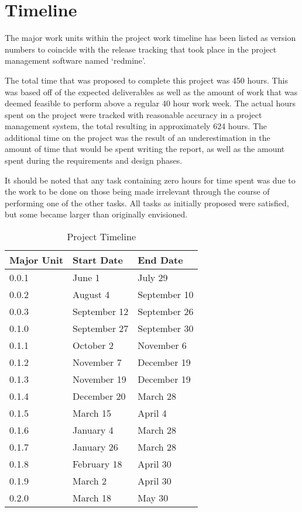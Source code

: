 \section{Timeline}\label{sec:timeline}

  The major work units within the project work timeline has been listed as
  version numbers to coincide with the release tracking that took place in the
  project management software named `redmine'.

  The total time that was proposed to complete this project was 450 hours. This
  was based off of the expected deliverables as well as the amount of work that
  was deemed feasible to perform above a regular 40 hour work week. The actual
  hours spent on the project were tracked with reasonable accuracy in a project
  management system, the total resulting in approximately 624 hours. The
  additional time on the project was the result of an underestimation in the
  amount of time that would be spent writing the report, as well as the amount
  spent during the requirements and design phases.

  It should be noted that any task containing zero hours for time spent was due
  to the work to be done on those being made irrelevant through the course of
  performing one of the other tasks. All tasks as initially proposed were
  satisfied, but some became larger than originally envisioned.

  \begin{table}[H]
    \centering
    \begin{tabular}{l p{4cm} p{4cm}}
      \toprule
      Major Unit & Start Date & End Date \\ [0.5ex]
      \midrule
      0.0.1 & June 1       & July 29      \\
      0.0.2 & August 4     & September 10 \\
      0.0.3 & September 12 & September 26 \\
      0.1.0 & September 27 & September 30 \\
      0.1.1 & October 2    & November 6   \\
      0.1.2 & November 7   & December 19  \\
      0.1.3 & November 19  & December 19  \\
      0.1.4 & December 20  & March 28     \\
      0.1.5 & March 15     & April 4      \\
      0.1.6 & January 4    & March 28     \\
      0.1.7 & January 26   & March 28     \\
      0.1.8 & February 18  & April 30     \\
      0.1.9 & March 2      & April 30     \\
      0.2.0 & March 18     & May 30       \\
      \bottomrule
    \end{tabular}
    \caption{Project Timeline}\label{tab:timeline}
  \end{table}

